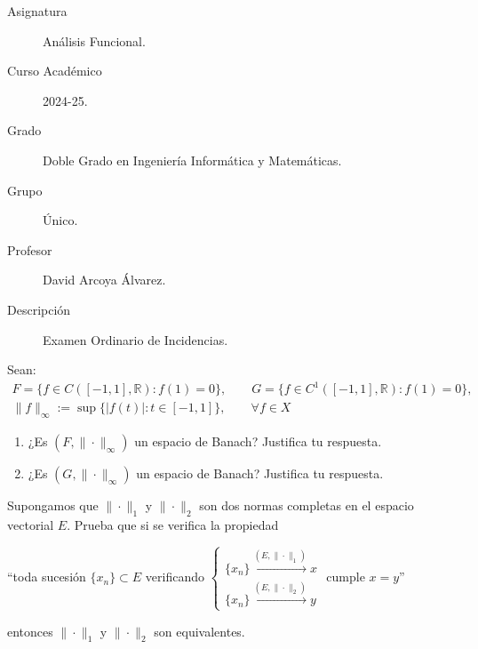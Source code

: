 \documentclass[12pt]{article}
\begin{document}

    
    

    \begin{description}
        \item[Asignatura] Análisis Funcional.
        \item[Curso Académico] 2024-25.
        \item[Grado] Doble Grado en Ingeniería Informática y Matemáticas.
        \item[Grupo] Único.
        \item[Profesor] David Arcoya Álvarez.
        \item[Descripción] Examen Ordinario de Incidencias.
    
    \end{description}
    \newpage



    \begin{ejercicio}[3 puntos]
        Sean:
        \begin{gather*}
            F=\{f\in C([-1,1],\mathbb{R}) : f(1) = 0\}, \qquad G = \{f\in C^1([-1,1],\mathbb{R}) : f(1) = 0\}, \\
            \|f\|_\infty := \sup\{|f(t)|:t\in [-1,1]\}, \qquad \forall f\in X
        \end{gather*}
        \begin{enumerate}[label=\alph*)]
            \item ¿Es $(F,\|\cdot \|_\infty)$ un espacio de Banach? Justifica tu respuesta.
            \item ¿Es $(G,\|\cdot \|_\infty)$ un espacio de Banach? Justifica tu respuesta.
        \end{enumerate}
    \end{ejercicio}

    \begin{ejercicio}[3 puntos]
        Supongamos que $\|\cdot \|_1$ y $\|\cdot \|_2$ son dos normas completas en el espacio vectorial $E$. Prueba que si se verifica la propiedad
        \begin{center}
            ``toda sucesión $\{x_n\}\subset E$ verificando $
                \left\{\begin{array}{l}
                    \{x_n\} \stackrel{(E,\|\cdot \|_1)}{\longrightarrow} x \\
                    \{x_n\} \stackrel{(E,\|\cdot \|_2)}{\longrightarrow} y
                \end{array}\right.$ cumple $x=y$''
        \end{center}
        entonces $\|\cdot \|_1$ y $\|\cdot \|_2$ son equivalentes.
    \end{ejercicio}
\end{document}
